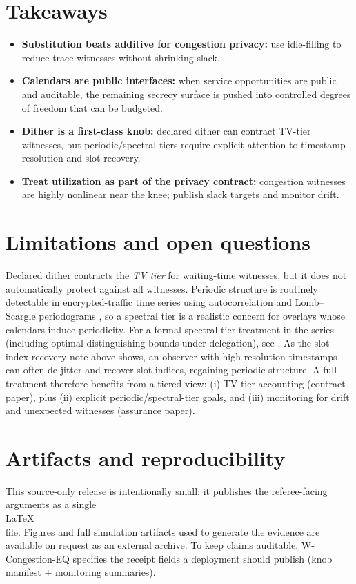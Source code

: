 \documentclass[11pt]{article}
\theoremstyle{definition}
\theoremstyle{remark}
\begin{document}
\section{Takeaways}
\begin{itemize}[leftmargin=*]
\item \textbf{Substitution beats additive for congestion privacy:} use idle-filling to reduce trace witnesses without shrinking slack.
\item \textbf{Calendars are public interfaces:} when service opportunities are public and auditable, the remaining secrecy surface is pushed into controlled degrees of freedom that can be budgeted.
\item \textbf{Dither is a first-class knob:} declared dither can contract TV-tier witnesses, but periodic/spectral tiers require explicit attention to timestamp resolution and slot recovery.
\item \textbf{Treat utilization as part of the privacy contract:} congestion witnesses are highly nonlinear near the knee; publish slack targets and monitor drift.
\end{itemize}

\section{Limitations and open questions}
Declared dither contracts the \emph{TV tier} for waiting-time witnesses, but it does not automatically protect against all witnesses.
Periodic structure is routinely detectable in encrypted-traffic time series using autocorrelation and Lomb--Scargle periodograms \cite{lomb1976,scargle1982,koumar2022periodic,assadhan2014,periodicity2025}, so a spectral tier is a realistic concern for overlays whose calendars induce periodicity. For a formal spectral-tier treatment in the series (including optimal distinguishing bounds under delegation), see \cite{series:spectral}.
As the slot-index recovery note above shows, an observer with high-resolution timestamps can often de-jitter and recover slot indices, regaining periodic structure.
A full treatment therefore benefits from a tiered view: (i) TV-tier accounting (contract paper), plus (ii) explicit periodic/spectral-tier goals, and (iii) monitoring for drift and unexpected witnesses (assurance paper).


\section{Artifacts and reproducibility}
This source-only release is intentionally small: it publishes the referee-facing arguments as a single \\LaTeX\\ file.
Figures and full simulation artifacts used to generate the evidence are available on request as an external archive.
To keep claims auditable, W-Congestion-EQ specifies the receipt fields a deployment should publish (knob manifest + monitoring summaries).
\end{document}
